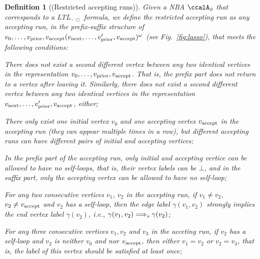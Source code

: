 \documentclass[Afour,sageh,times]{sagej}
\newtheorem{defn}[thm]{Definition}
\newcounter{mycounter}
\newenvironment{noindlist}
 {\begin{list}{\alph{mycounter})~~}{\usecounter{mycounter} \labelsep=0em \labelwidth=0em \leftmargin=0em \itemindent=0em}}
 {\end{list}}
\newcommand{\ltl}{ {\it LTL}$_{-\bigcirc}$ }
\newcommand{\autop}{\ccalA_{\phi}}
\newcommand{\vertex}[1]{v_{\textup{#1}}}
\newcommand{\simplies}{\DOTSB\Longrightarrow}
\begin{document}
\begin{defn}[(Restricted accepting runs)]\label{defn:run}
  Given a NBA $\autop$ that corresponds to a \ltl formula, we define the  restricted accepting run as any accepting run, in the prefix-suffix structure of $v_0, \ldots, \vertex{prior}, \vertex{accept} (\vertex{next}, \ldots, \vertex{prior}', \vertex{accept})^\omega$ (see Fig.~\ref{fig:lasso}), that meets the following conditions:
  \begin{noindlist}
    \setlength\itemsep{0em}
  \item \label{cond:a} There does not exist a  second  different vertex between any two identical vertices  in the representation  $v_0, \ldots, \vertex{prior}, \vertex{accept}$. That is, the prefix part does not return to a vertex after leaving it. Similarly, there does not exist a second different vertex  between any two identical vertices in the representation $\vertex{next}, \ldots, \vertex{prior}', \vertex{accept}$, either;
  \item \label{cond:b} There only exist one initial vertex $v_0$ and one  accepting vertex $\vertex{accept}$ in the accepting run (they can appear multiple times in a row), but different accepting runs can have different pairs of initial and accepting vertices;
 \item \label{cond:c} In the prefix part of the accepting run, only initial and accepting vertice can be allowed to have no self-loops, that is, their vertex labels  can be $\bot$, and in the suffix part,  only the accepting vertex can be allowed to have no self-loop;
 \item  \label{cond:d} For any two consecutive vertices $v_1$, $v_2$ in the accepting run, if $v_1 \neq v_2$, $v_2\neq \vertex{accept}$ and $v_2$ has a self-loop, then the edge label $\gamma(v_1, v_2)$ strongly implies    the end vertex label $\gamma(v_2)$, i.e., $\gamma(v_1, v_2) \simplies_s \gamma(v_2)$;
 \item \label{cond:e} For any three consecutive vertices $v_1, v_2$ and $v_3$ in the acceting run, if $v_2$ has a self-loop and $v_2$ is neither $v_0$ and nor $\vertex{accept}$, then either $v_1 = v_2$ or $v_2 = v_3$, that is, the label of this vertex should be satisfied at least once;

\end{noindlist}
\end{defn}
\end{document}
